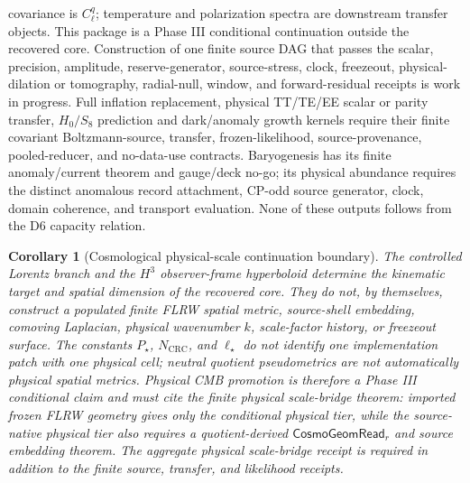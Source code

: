 \documentclass[11pt]{article}
\newtheorem{corollary}[theorem]{Corollary}
\begin{document}
covariance is \(C_\ell^q\); temperature and polarization spectra are downstream transfer objects.
This package is a Phase III conditional continuation outside the recovered core. Construction of
one finite source DAG that passes the scalar, precision, amplitude, reserve-generator,
source-stress, clock, freezeout, physical-dilation or tomography, radial-null, window, and
forward-residual receipts is work in progress. Full inflation replacement, physical TT/TE/EE
scalar or parity transfer,
\(H_0/S_8\) prediction and dark/anomaly growth kernels require their finite
covariant Boltzmann-source, transfer, frozen-likelihood, source-provenance, pooled-reducer, and
no-data-use contracts. Baryogenesis has its finite anomaly/current theorem and gauge/deck no-go;
its physical abundance requires the distinct anomalous record attachment, CP-odd source generator,
clock, domain coherence, and transport evaluation. None of these outputs follows from the D6 capacity relation.

\begin{corollary}[Cosmological physical-scale continuation boundary]
The controlled Lorentz branch and the \(H^3\) observer-frame hyperboloid determine the
kinematic target and spatial dimension of the recovered core.  They do not, by themselves, construct
a populated finite FLRW spatial metric, source-shell embedding, comoving Laplacian, physical
wavenumber \(k\), scale-factor history, or freezeout surface.  The constants \(P_\star\),
\(N_{\mathrm{CRC}}\), and \(\ell_\star\) do not identify one implementation patch with one physical
cell; neutral quotient pseudometrics are not automatically physical spatial metrics.  Physical CMB
promotion is therefore a Phase III conditional claim and must cite the finite physical
scale-bridge theorem: imported frozen FLRW geometry gives only the
\emph{conditional physical} tier, while the \emph{source-native physical} tier also requires a
quotient-derived \(\mathsf{CosmoGeomRead}_r\) and source embedding theorem.  The aggregate physical
scale-bridge receipt is required in addition to the finite source, transfer, and likelihood
receipts.
\end{corollary}
\end{document}
